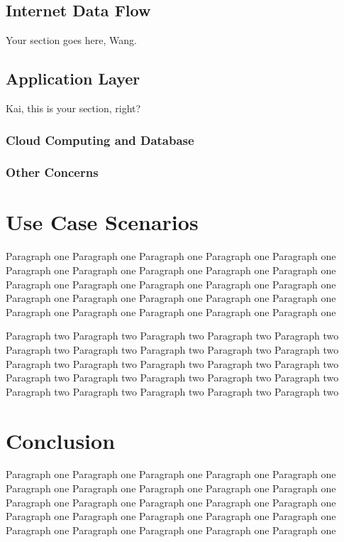 \documentclass[10pt,journal,final,a4paper,nofonttune]{IEEEtran}
\begin{document}
\subsection{Internet Data Flow}


Your section goes here, Wang.






\subsection{Application Layer}

Kai, this is your section, right?\cite{springer.978.3.030.34986.8.Chapter.720200101}

\subsubsection{Cloud Computing and Database}



\subsubsection{Other Concerns}






\section{Use Case Scenarios}
Paragraph one Paragraph one Paragraph one Paragraph one Paragraph one 
Paragraph one Paragraph one Paragraph one Paragraph one Paragraph one 
Paragraph one Paragraph one Paragraph one Paragraph one Paragraph one 
Paragraph one Paragraph one Paragraph one Paragraph one Paragraph one 
Paragraph one Paragraph one Paragraph one Paragraph one Paragraph one 

Paragraph two Paragraph two Paragraph two Paragraph two Paragraph two 
Paragraph two Paragraph two Paragraph two Paragraph two Paragraph two 
Paragraph two Paragraph two Paragraph two Paragraph two Paragraph two 
Paragraph two Paragraph two Paragraph two Paragraph two Paragraph two 
Paragraph two Paragraph two Paragraph two Paragraph two Paragraph two 

\section{Conclusion}

Paragraph one Paragraph one Paragraph one Paragraph one Paragraph one 
Paragraph one Paragraph one Paragraph one Paragraph one Paragraph one 
Paragraph one Paragraph one Paragraph one Paragraph one Paragraph one 
Paragraph one Paragraph one Paragraph one Paragraph one Paragraph one 
Paragraph one Paragraph one Paragraph one Paragraph one Paragraph one 
\end{document}
